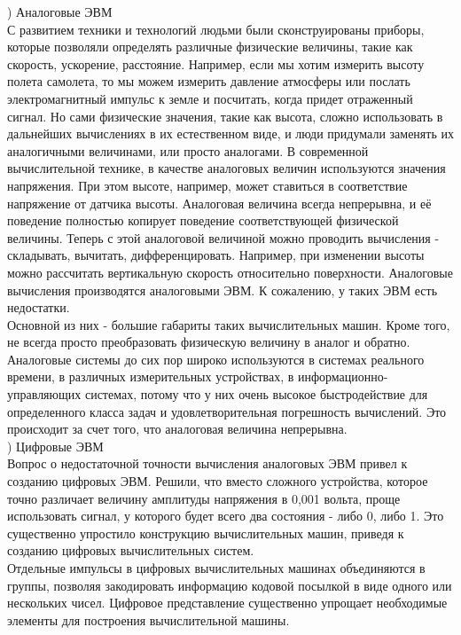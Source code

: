 ) Аналоговые ЭВМ \\
С развитием техники и технологий людьми были сконструированы приборы, которые позволяли определять различные физические величины, такие как скорость, ускорение, расстояние. Например, если мы хотим измерить высоту полета самолета, то мы можем измерить давление атмосферы или послать электромагнитный импульс к земле и посчитать, когда придет отраженный сигнал. Но сами физические значения, такие как высота, сложно использовать в дальнейших вычислениях в их естественном виде, и люди придумали заменять их аналогичными величинами, или просто аналогами. В современной вычислительной технике, в качестве аналоговых величин используются значения напряжения. При этом высоте, например, может ставиться в соответствие напряжение от датчика высоты. Аналоговая величина всегда непрерывна, и её поведение полностью копирует поведение соответствующей физической величины. Теперь с этой аналоговой величиной можно проводить вычисления - складывать, вычитать, дифференцировать. Например, при изменении высоты можно рассчитать вертикальную скорость относительно поверхности. Аналоговые вычисления производятся аналоговыми ЭВМ. К сожалению, у таких ЭВМ есть недостатки. \\
Основной из них - большие габариты таких вычислительных машин. Кроме того, не всегда просто преобразовать физическую величину в аналог и обратно. Аналоговые системы до сих пор широко используются в системах реального времени, в различных измерительных устройствах, в информационно-управляющих системах, потому что у них очень высокое быстродействие для определенного класса задач и удовлетворительная погрешность вычислений. Это происходит за счет того, что аналоговая величина непрерывна. \\

) Цифровые ЭВМ \\
Вопрос о недостаточной точности вычисления аналоговых ЭВМ привел к созданию цифровых ЭВМ. Решили, что вместо сложного устройства, которое точно различает величину амплитуды напряжения в 0,001 вольта, проще использовать сигнал, у которого будет всего два состояния - либо 0, либо 1. Это существенно упростило конструкцию вычислительных машин, приведя к созданию цифровых вычислительных систем. \\
Отдельные импульсы в цифровых вычислительных машинах объединяются в группы, позволяя закодировать информацию кодовой посылкой в виде одного или нескольких чисел. Цифровое представление существенно упрощает необходимые элементы для построения вычислительной машины. \\

